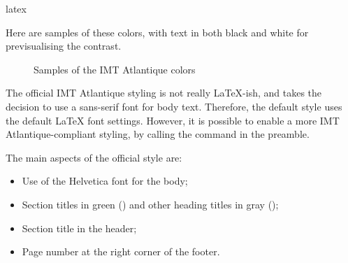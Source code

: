 \documentclass{report}
\begin{document}
\begin{imtaCode}{latex}
\end{imtaCode}

Here are samples of these colors, with text in both black and white for previsualising the contrast.

\begin{figure}[H]
    \centering
    \caption{Samples of the IMT Atlantique colors}
    \label{fig:imtaColors}
\end{figure}


The official IMT Atlantique styling is not really \LaTeX-ish, and takes the decision to use a sans-serif font for body text.
Therefore, the default style uses the default \LaTeX{} font settings.
However, it is possible to enable a more IMT Atlantique-compliant styling, by calling the  command in the preamble.

\vspace{1em}
The main aspects of the official style are:

\begin{itemize}
    \item Use of the Helvetica font for the body;
    \item Section titles in green () and other heading titles in gray ();
    \item Section title in the header;
    \item Page number at the right corner of the footer.
\end{itemize}
\end{document}
